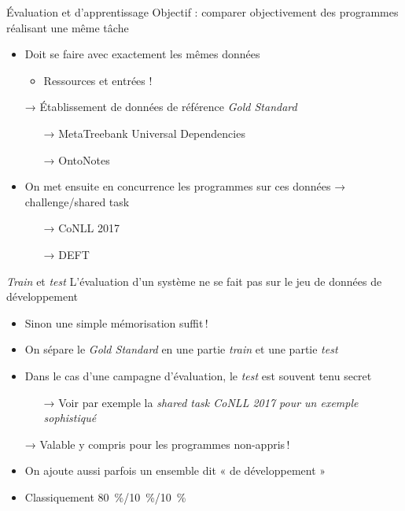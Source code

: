 \documentclass[hyperref={unicode}, xcolor={svgnames}]{beamer}
\begin{document}
\begin{frame}{Évaluation et d'apprentissage}
    Objectif : comparer \alert{objectivement} des programmes réalisant une même tâche
    \begin{itemize}
        \item Doit se faire avec exactement les mêmes données
            \begin{itemize}
                \item Ressources et entrées !
            \end{itemize}
        \item[→] Établissement de données de référence \alert{\textit{Gold Standard}}
            \begin{itemize}
                \item[→] MetaTreebank Universal Dependencies 
                \item[→] OntoNotes 
            \end{itemize}
        \item On met ensuite en concurrence les programmes sur ces données → challenge/shared task
            \begin{itemize}
                \item[→] CoNLL 2017 
                \item[→] \alert{DEFT} 
            \end{itemize}
    \end{itemize}
\end{frame}

\begin{frame}{\textit{Train} et \textit{test}}
    L'évaluation d'un système ne se fait pas sur le jeu de données de développement
    \begin{itemize}
        \item Sinon une simple mémorisation suffit !
        \item On sépare le \textit{Gold Standard} en une partie \alert{\textit{train}} et une partie \alert{\textit{test}}
        \item Dans le cas d'une campagne d'évaluation, le \textit{test} est souvent tenu secret
            \begin{itemize}
                \item[→] Voir par exemple la \textit{shared task CoNLL 2017 pour un exemple sophistiqué}
            \end{itemize}
        \item[→] Valable y compris pour les programmes non-appris !
        \item On ajoute aussi parfois un ensemble dit « de développement »
        \item Classiquement \SI{80}{\percent}/\SI{10}{\percent}/\SI{10}{\percent}
    \end{itemize}
\end{frame}
\end{document}
